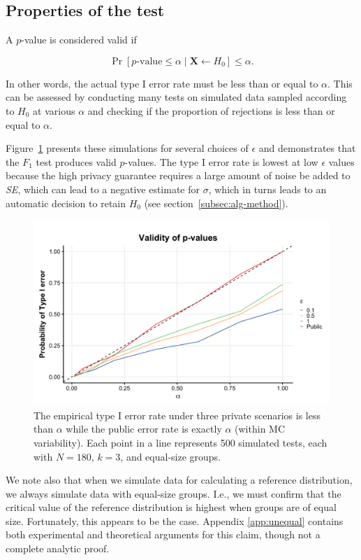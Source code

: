 \documentclass[USenglish,oneside]{article}
\newcounter{ag}
\newcounter{ab}
\newcounter{ar}
\newcounter{igh}
\newcommand{\se}{\textit{SE}\xspace}
\newcommand{\X}{\ensuremath{\mathbf{X}}\xspace}
\begin{document}
\subsection{Properties of the test}\label{subsec:properties}

A $p$-value is considered valid if ~\cite{casellaberger2002}

$$
\Pr[p\textrm{-value} \le \alpha \mid \X \leftarrow H_0] \le \alpha.
$$

In other words, the actual type I error rate must be less than or equal to $\alpha$. This can be assessed by conducting many tests on simulated data sampled according to $H_0$ at various $\alpha$ and checking if the proportion of rejections is less than or equal to $\alpha$. 

Figure~\ref{Fig:valid-pvals} presents these simulations for several choices of $\epsilon$ and demonstrates that the $F_1$ test produces valid $p$-values. The type I error rate is lowest at low $\epsilon$ values because the high privacy guarantee requires a large amount of noise be added to \se, which can lead to a negative estimate for $\sigma$, which in turns leads to an automatic decision to retain $H_0$ (see section~\ref{subsec:alg-method}).

\begin{figure}
\centering
\includegraphics[width=.8\linewidth]{images/valid-pvals.png}
\caption{The empirical type I error rate under three private scenarios is less than $\alpha$ while the public error rate is exactly $\alpha$ (within MC variability). Each point in a line represents 500 simulated tests, each with $N = 180$, $k=3$, and equal-size groups.\label{Fig:valid-pvals}}
\end{figure}

We note also that when we simulate data for calculating a reference distribution, we always simulate data with equal-size groups.  I.e., we must confirm that the critical value of the reference distribution is highest when groups are of equal size.  Fortunately, this appears to be the case.  Appendix \ref{app:unequal} contains both experimental and theoretical arguments for this claim, though not a complete analytic proof.
\end{document}
